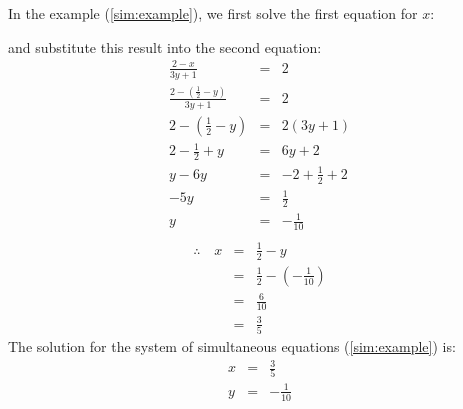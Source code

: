 \documentclass[10pt,a4paper,titlepage,twoside,openright]{report}
\begin{document}
In the example (\ref{sim:example}), we first solve the first equation for $x$:

and substitute this result into the second equation:
\begin{eqnarray*}
\frac{2-x}{3y+1}&=&2\\
\frac{2-(\frac{1}{2}-y)}{3y+1}&=&2\\
2-(\frac{1}{2}-y)&=&2(3y+1)\\
2-\frac{1}{2}+y&=&6y+2\\
y-6y&=&-2+\frac{1}{2}+2\\
-5y&=&\frac{1}{2}\\
y&=&-\frac{1}{10}\\
\end{eqnarray*}
\begin{eqnarray*}
\therefore \quad x &=&\frac{1}{2}-y\\
&=&\frac{1}{2}-(-\frac{1}{10})\\
&=&\frac{6}{10}\\
&=&\frac{3}{5}
\end{eqnarray*}
The solution for the system of simultaneous equations (\ref{sim:example}) is:
\begin{eqnarray*}
x&=&\frac{3}{5}\\
y&=&-\frac{1}{10}
\end{eqnarray*}
\end{document}
